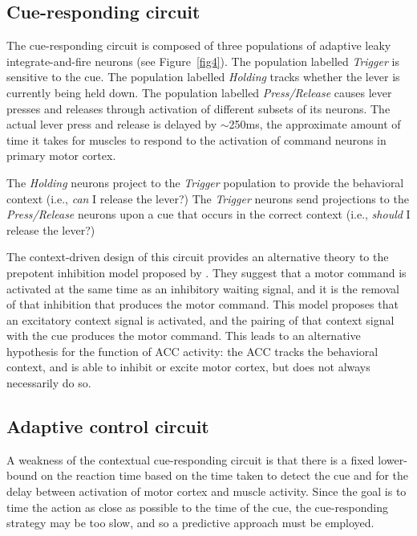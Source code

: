 \documentclass[11pt]{article}
\begin{document}
\subsection{Cue-responding circuit}

The cue-responding circuit is composed
of three populations
of adaptive leaky integrate-and-fire neurons
(see Figure~\ref{fig4}).
The population labelled \textit{Trigger}
is sensitive to the cue.
The population labelled \textit{Holding}
tracks whether the lever is currently being held down.
The population labelled \textit{Press/Release}
causes lever presses and releases
through activation of different subsets
of its neurons.
The actual lever press and release
is delayed by $\sim$250ms,
the approximate amount of time
it takes for muscles to respond
to the activation of command neurons
in primary motor cortex.  %

The \textit{Holding} neurons project
to the \textit{Trigger} population
to provide the behavioral context
(i.e., \textit{can} I release the lever?)
The \textit{Trigger} neurons send projections
to the \textit{Press/Release} neurons
upon a cue that occurs in the correct context
(i.e., \textit{should} I release the lever?)

The context-driven design of this circuit
provides an alternative theory to
the prepotent inhibition model
proposed by \citet{Narayanan2009}.
They suggest that a motor command
is activated at the same time
as an inhibitory waiting signal,
and it is the removal of that inhibition
that produces the motor command.
This model proposes that
an excitatory context signal is activated,
and the pairing of that context signal
with the cue produces the motor command.
This leads to an alternative hypothesis
for the function of ACC activity:
the ACC tracks the behavioral context,
and is able to inhibit or excite motor cortex,
but does not always necessarily do so.

\subsection{Adaptive control circuit}

A weakness of the contextual cue-responding circuit
is that there is a fixed lower-bound
on the reaction time
based on the time taken to detect the cue
and for the delay between activation
of motor cortex and muscle activity.
Since the goal is to time the action
as close as possible to the time of the cue,
the cue-responding strategy may be too slow,
and so a predictive approach must be employed.
\end{document}

